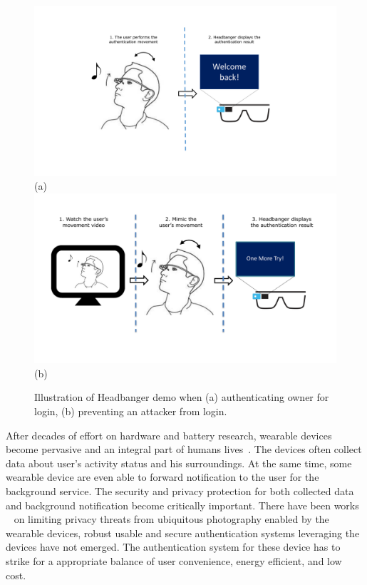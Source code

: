 \begin{figure}
	\centering
	\includegraphics [width=0.9\columnwidth]{pic/demo_illus2.pdf}\\
	\centering
	(a)\\

	\includegraphics [width=0.9\columnwidth]{pic/demo_illus.pdf}\\
	\centering
	(b)\\

\caption{Illustration of Headbanger demo when (a) authenticating owner for login, (b) preventing an attacker from login.}
\label{fig:headbanger-illustrate}
\end{figure}

\iffalse
After decades of effort on hardware and battery research, wearable devices become pervasive and an integral part of humans lives~\cite{googleglass,smartwatch,fitbit}. The devices often collect data about user's activity status and his surroundings. At the same time, some wearable device are even able to forward notification to the user for the background service. The security and  privacy protection for both collected data and background notification become critically important. There have been works ~\cite{hoyle2015sensitive,hoyle2014privacy,jana2013scanner} on limiting privacy  threats from ubiquitous photography enabled by the wearable devices, robust usable and secure authentication systems leveraging the devices have not emerged.  The authentication system for these device has to strike for a appropriate balance of user convenience, energy efficient, and low cost.

